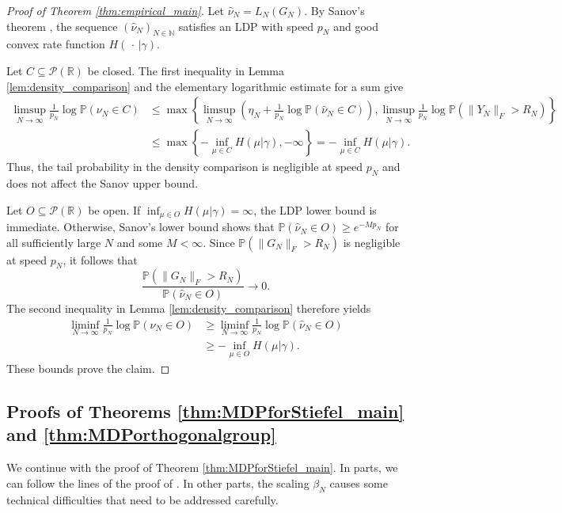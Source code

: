 \documentclass[11pt,a4paper,twoside]{article}
\renewcommand{\P}{\mathbb P}
\newcommand{\R}{\mathbb R}
\newcommand{\N}{\mathbb N}
\theoremstyle{definition}
\begin{document}
\begin{proof}[Proof of Theorem \ref{thm:empirical_main}]
	Let $\widehat\nu_N=L_N(G_N)$. By Sanov's theorem \cite[Theorem 6.2.10]{dembo2009techniques}, the sequence $(\widehat\nu_N)_{N\in\N}$ satisfies an LDP with speed $p_N$ and good convex rate function $H(\,\cdot\,|\gamma)$.

	Let $C\subseteq\mathcal P(\R)$ be closed. The first inequality in Lemma \ref{lem:density_comparison} and the elementary logarithmic estimate for a sum give
	\begin{align*}
	\limsup_{N\to\infty}\frac{1}{p_N}\log\P(\nu_N\in C)
	&\le \max\left\{\limsup_{N\to\infty}\left(\eta_N+\frac{1}{p_N}\log\P(\widehat\nu_N\in C)\right),
	\limsup_{N\to\infty}\frac{1}{p_N}\log\P(\|Y_N\|_F>R_N)\right\}\\
	&\le \max\left\{-\inf_{\mu\in C}H(\mu|\gamma),-\infty\right\}
	=-\inf_{\mu\in C}H(\mu|\gamma).
	\end{align*}
	Thus, the tail probability in the density comparison is negligible at speed $p_N$ and does not affect the Sanov upper bound.

	Let $O\subseteq\mathcal P(\R)$ be open. If $\inf_{\mu\in O}H(\mu|\gamma)=\infty$, the LDP lower bound is immediate. Otherwise, Sanov's lower bound shows that $\P(\widehat\nu_N\in O)\ge e^{-Mp_N}$ for all sufficiently large $N$ and some $M<\infty$. Since $\P(\|G_N\|_F>R_N)$ is negligible at speed $p_N$, it follows that
	$$
	\frac{\P(\|G_N\|_F>R_N)}{\P(\widehat\nu_N\in O)}\longrightarrow0.
	$$
	The second inequality in Lemma \ref{lem:density_comparison} therefore yields
	\begin{align*}
	\liminf_{N\to\infty}\frac{1}{p_N}\log\P(\nu_N\in O)
	&\ge \liminf_{N\to\infty}\frac{1}{p_N}\log\P(\widehat\nu_N\in O)\\
	&\ge -\inf_{\mu\in O}H(\mu|\gamma).
	\end{align*}
	These bounds prove the claim.
\end{proof}

	\subsection{Proofs of Theorems \ref{thm:MDPforStiefel_main} and \ref{thm:MDPorthogonalgroup}}

	We continue with the proof of Theorem \ref{thm:MDPforStiefel_main}. In parts, we can follow the lines of the proof of \cite[Theorem B]{KabluchkoLarge}. In other parts, the scaling $\beta_N$ causes some technical difficulties that need to be addressed carefully.
\end{document}
